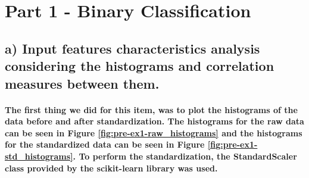 \documentclass[a4paper]{article}
\begin{document}
\section{Part 1 - Binary Classification}

\subsection{a) Input features characteristics analysis considering the histograms and correlation measures between them.}

\paragraph{The first thing we did for this item, was to plot the histograms of the data before and after standardization. The histograms for the raw data can be seen in Figure \ref{fig:pre-ex1-raw_histograms} and the histograms for the standardized data can be seen in Figure \ref{fig:pre-ex1-std_histograms}. To perform the standardization, the StandardScaler class provided by the scikit-learn library was used.}

\end{document}
